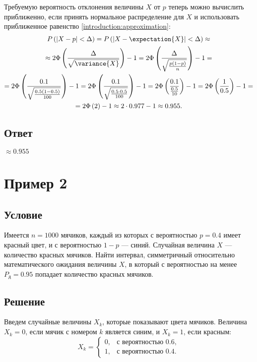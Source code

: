 \documentclass[a4paper,12pt]{article}
\begin{document}
    Требуемую вероятность отклонения величины $X$ от $p$ теперь можно вычислить приближенно, если принять нормальное распределение для $X$ и использовать приближенное
    равенство \eqref{introduction:approximation}:
    \begin{multline}
        \probability{\modulus{X - p} < \Delta}
        = \probability{\modulus{X - \expectation{X}} < \Delta} \approx \\
        \approx 2 \Phi \left ( \frac{\Delta}{\sqrt{\variance{X}}} \right ) - 1
        = 2 \Phi \left ( \frac{\Delta}{\sqrt{\frac{p (1-p)}{n}}} \right ) - 1 = \\
        = 2 \Phi \left ( \frac{0.1}{\sqrt{\frac{0.5 (1-0.5)}{100}}} \right ) - 1
        = 2 \Phi \left ( \frac{0.1}{\sqrt{\frac{0.5 \cdot 0.5}{100}}} \right ) - 1
        = 2 \Phi \left ( \frac{0.1}{\frac{0.5}{10}} \right ) - 1
        = 2 \Phi \left ( \frac{1}{0.5} \right ) - 1 = \\
        = 2 \Phi \left ( 2 \right ) - 1
        \approx 2 \cdot 0.977 - 1
        \approx 0.955 .
    \end{multline}

    \subsection*{Ответ}
    $\approx 0.955$


    \section{Пример 2}
    \subsection*{Условие}
    Имеется $n = 1000$ мячиков, каждый из которых с вероятностью $p = 0.4$ имеет красный цвет, и с вероятностью $1 - p$ --- синий.
    Случайная величина $X$ --- количество красных мячиков. Найти интервал, симметричный относительно математического ожидания величины $X$,
    в который с вероятностью на менее $P_\text{д} = 0.95$ попадает количество красных мячиков.
    \subsection*{Решение}
    Введем случайные величины $X_k$, которые показывают цвета мячиков. Величина $X_k = 0$, если мячик с номером $k$ является синим, и $X_k = 1$, если красным:
    \begin{equation}
        X_k =
        \left \{
        \begin{array}{ll}
            0, & \text{с вероятностью } 0.6 , \\
            1, & \text{с вероятностью } 0.4 .
        \end{array}
        \right .
    \end{equation}
\end{document}
